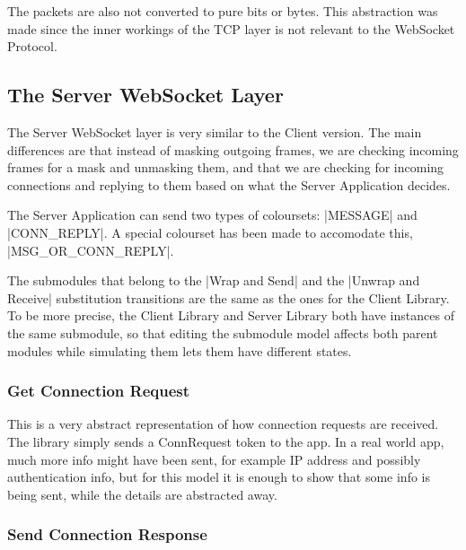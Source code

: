	The packets are also not converted to pure bits or bytes. This abstraction was
	made since the inner workings of the TCP layer is not relevant to the WebSocket
	Protocol.

\subsection{The Server WebSocket Layer}
	
	
	The Server WebSocket layer is very similar to the Client version. The main
	differences are that instead of masking outgoing frames, we are checking
	incoming frames for a mask and unmasking them, and that we are checking for
	incoming connections and replying to them based on what the Server Application
	decides.
	
	The Server Application can send two types of coloursets: |MESSAGE| and
	|CONN_REPLY|. A special colourset has been made to accomodate this,
	|MSG_OR_CONN_REPLY|. 
	
	The submodules that belong to the |Wrap and Send| and the
	|Unwrap and Receive| substitution transitions are the same as the ones for the Client Library. To
	be more precise, the Client Library and Server Library both have instances of
	the same submodule, so that editing the submodule model affects both parent
	modules while simulating them lets them have different states.
	
	\subsubsection{Get Connection Request}
		
		
		This is a very abstract representation of how connection requests are
		received. The library simply sends a ConnRequest token to the app. In a real
		world app, much more info might have been sent, for example IP address and
		possibly authentication info, but for this model it is enough to show that
		some info is being sent, while the details are abstracted away. 

	\subsubsection{Send Connection Response}
		
		
